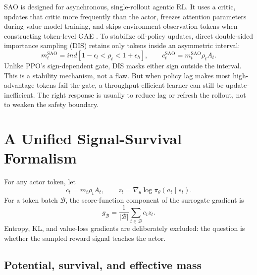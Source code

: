 \documentclass{article}
\begin{document}
SAO is designed for asynchronous, single-rollout agentic RL.  It uses a
critic, updates that critic more frequently than the actor, freezes attention
parameters during value-model training, and skips environment-observation
tokens when constructing token-level GAE \citep{hou2026sao}.  To stabilize
off-policy updates, direct double-sided importance sampling (DIS) retains only
tokens inside an asymmetric interval:
\begin{equation}
  m_t^{\mathrm{SAO}}=ind\!\left[1-\epsilon_l < \rho_t < 1+\epsilon_h\right],
  \qquad
  c_t^{\mathrm{SAO}}=m_t^{\mathrm{SAO}}\rho_t A_t.
  \label{eq:sao-gate}
\end{equation}
Unlike PPO's sign-dependent gate, DIS masks either sign outside the interval.
This is a stability mechanism, not a flaw.  But when policy lag makes most
high-advantage tokens fail the gate, a throughput-efficient learner can still
be update-inefficient.  The right response is usually to reduce lag or refresh
the rollout, not to weaken the safety boundary.

\section{A Unified Signal-Survival Formalism}
\label{sec:formalism}

For any actor token, let
\begin{equation}
  c_t=m_t\rho_t A_t,
  \qquad
  z_t=\nabla_\theta\log\pi_\theta(a_t\mid s_t).
  \label{eq:coefficient}
\end{equation}
For a token batch $\mathcal{B}$, the score-function component of the surrogate
gradient is
\begin{equation}
  g_{\mathcal{B}}=\frac{1}{|\mathcal{B}|}
  \sum_{t\in\mathcal{B}}c_t z_t.
  \label{eq:gradient}
\end{equation}
Entropy, KL, and value-loss gradients are deliberately excluded: the question
is whether the sampled reward signal teaches the actor.

\subsection{Potential, survival, and effective mass}
\end{document}
